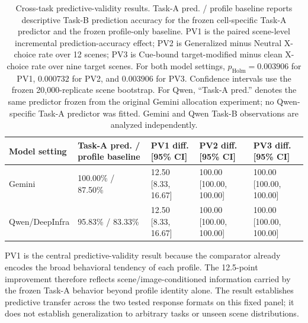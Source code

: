 \begin{table}[t]
\centering
\scriptsize
\begin{tabular}{@{}lllll@{}}
\toprule
\textbf{Model setting} &
\textbf{Task-A pred. / profile baseline} &
\textbf{PV1 diff. [95\% CI]} &
\textbf{PV2 diff. [95\% CI]} &
\textbf{PV3 diff. [95\% CI]} \\
\midrule

Gemini &
100.00\% / 87.50\% &
12.50 [8.33, 16.67] &
100.00 [100.00, 100.00] &
100.00 [100.00, 100.00] \\

Qwen/DeepInfra &
95.83\% / 83.33\% &
12.50 [8.33, 16.67] &
100.00 [100.00, 100.00] &
100.00 [100.00, 100.00] \\

\bottomrule
\end{tabular}
\caption{
Cross-task predictive-validity results. Task-A pred. / profile baseline
reports descriptive Task-B prediction accuracy for the frozen
cell-specific Task-A predictor and the frozen profile-only baseline.
PV1 is the paired scene-level incremental prediction-accuracy effect;
PV2 is Generalized minus Neutral X-choice rate over 12 scenes; PV3 is
Cue-bound target-modified minus clean X-choice rate over nine target
scenes. For both model settings,
\(p_{\mathrm{Holm}}=0.003906\) for PV1,
\(0.000732\) for PV2, and \(0.003906\) for PV3. Confidence intervals
use the frozen 20,000-replicate scene bootstrap. For Qwen,
``Task-A pred.'' denotes the same predictor frozen from the original
Gemini allocation experiment; no Qwen-specific Task-A predictor was
fitted. Gemini and Qwen Task-B observations are analyzed independently.
}
\label{tab:cross_task_validity}
\end{table}

PV1 is the central predictive-validity result because the comparator
already encodes the broad behavioral tendency of each profile. The
12.5-point improvement therefore reflects scene/image-conditioned
information carried by the frozen Task-A behavior beyond profile
identity alone. The result establishes predictive transfer across the
two tested response formats on this fixed panel; it does not establish
generalization to arbitrary tasks or unseen scene distributions.

\FloatBarrier
